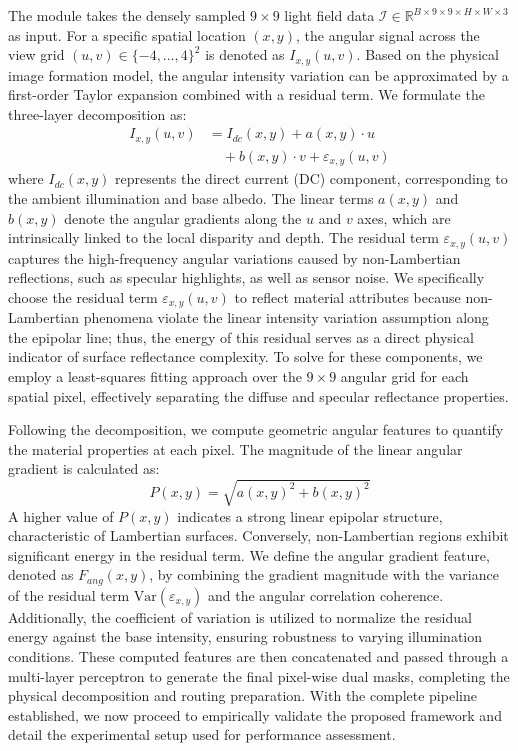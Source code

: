 \documentclass[lettersize,journal]{IEEEtran}
\begin{document}
The module takes the densely sampled $9 \times 9$ light field data $\mathcal{I} \in \mathbb{R}^{B \times 9 \times 9 \times H \times W \times 3}$ as input. For a specific spatial location $(x,y)$, the angular signal across the view grid $(u,v) \in \{-4, \dots, 4\}^2$ is denoted as $I_{x,y}(u,v)$. Based on the physical image formation model, the angular intensity variation can be approximated by a first-order Taylor expansion combined with a residual term. We formulate the three-layer decomposition as:
\begin{equation}
\begin{aligned}
I_{x,y}(u,v) &= I_{dc}(x,y) + a(x,y) \cdot u \\
&\quad + b(x,y) \cdot v + \varepsilon_{x,y}(u,v)
\end{aligned}
\end{equation}
where $I_{dc}(x,y)$ represents the direct current (DC) component, corresponding to the ambient illumination and base albedo. The linear terms $a(x,y)$ and $b(x,y)$ denote the angular gradients along the $u$ and $v$ axes, which are intrinsically linked to the local disparity and depth. The residual term $\varepsilon_{x,y}(u,v)$ captures the high-frequency angular variations caused by non-Lambertian reflections, such as specular highlights, as well as sensor noise. We specifically choose the residual term $\varepsilon_{x,y}(u,v)$ to reflect material attributes because non-Lambertian phenomena violate the linear intensity variation assumption along the epipolar line; thus, the energy of this residual serves as a direct physical indicator of surface reflectance complexity. To solve for these components, we employ a least-squares fitting approach over the $9 \times 9$ angular grid for each spatial pixel, effectively separating the diffuse and specular reflectance properties.

Following the decomposition, we compute geometric angular features to quantify the material properties at each pixel. The magnitude of the linear angular gradient is calculated as:
\begin{equation}
P(x,y) = \sqrt{a(x,y)^2 + b(x,y)^2}
\end{equation}
A higher value of $P(x,y)$ indicates a strong linear epipolar structure, characteristic of Lambertian surfaces. Conversely, non-Lambertian regions exhibit significant energy in the residual term. We define the angular gradient feature, denoted as $F_{ang}(x,y)$, by combining the gradient magnitude with the variance of the residual term $\text{Var}(\varepsilon_{x,y})$ and the angular correlation coherence. Additionally, the coefficient of variation is utilized to normalize the residual energy against the base intensity, ensuring robustness to varying illumination conditions. These computed features are then concatenated and passed through a multi-layer perceptron to generate the final pixel-wise dual masks, completing the physical decomposition and routing preparation. With the complete pipeline established, we now proceed to empirically validate the proposed framework and detail the experimental setup used for performance assessment.
\end{document}
